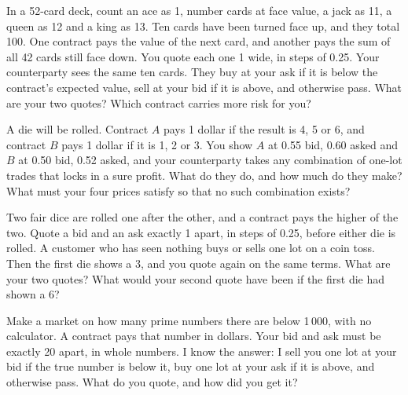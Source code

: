 \begin{question}\label{iq:iv2:making-a-market:4}
In a 52-card deck, count an ace as 1, number cards at face value, a jack as 11, a queen as 12 and a king as 13. Ten cards have been turned face up, and they total 100. One contract pays the value of the next card, and another pays the sum of all 42 cards still face down. You quote each one 1 wide, in steps of 0.25. Your counterparty sees the same ten cards. They buy at your ask if it is below the contract's expected value, sell at your bid if it is above, and otherwise pass. What are your two quotes? Which contract carries more risk for you?
\end{question}

\begin{question}\label{iq:iv2:making-a-market:5}
A die will be rolled. Contract $A$ pays 1 dollar if the result is 4, 5 or 6, and contract $B$ pays 1 dollar if it is 1, 2 or 3. You show $A$ at 0.55 bid, 0.60 asked and $B$ at 0.50 bid, 0.52 asked, and your counterparty takes any combination of one-lot trades that locks in a sure profit. What do they do, and how much do they make? What must your four prices satisfy so that no such combination exists?
\end{question}

\begin{question}\label{iq:iv2:making-a-market:6}
Two fair dice are rolled one after the other, and a contract pays the higher of the two. Quote a bid and an ask exactly 1 apart, in steps of 0.25, before either die is rolled. A customer who has seen nothing buys or sells one lot on a coin toss. Then the first die shows a 3, and you quote again on the same terms. What are your two quotes? What would your second quote have been if the first die had shown a 6?
\end{question}

\begin{question}\label{iq:iv2:making-a-market:7}
Make a market on how many prime numbers there are below 1\,000, with no calculator. A contract pays that number in dollars. Your bid and ask must be exactly 20 apart, in whole numbers. I know the answer: I sell you one lot at your bid if the true number is below it, buy one lot at your ask if it is above, and otherwise pass. What do you quote, and how did you get it?
\end{question}

